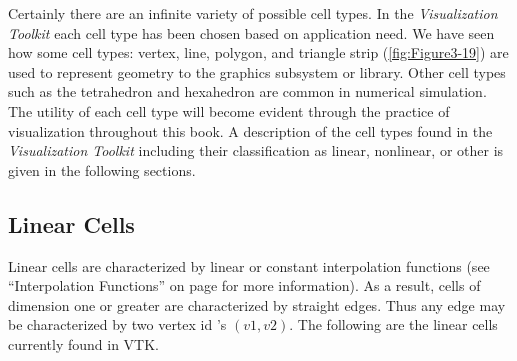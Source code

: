 Certainly there are an infinite variety of possible cell types. In the \emph{Visualization Toolkit} each cell type has been chosen based on application need. We have seen how some cell types: vertex, line, polygon, and triangle strip (\ref{fig:Figure3-19}) are used to represent geometry to the graphics subsystem or library. Other cell types such as the tetrahedron and hexahedron are common in numerical simulation. The utility of each cell type will become evident through the practice of visualization throughout this book. A description of the cell types found in the \emph{Visualization Toolkit} including their classification as linear, nonlinear, or other is given in the following sections.

\subsection{Linear Cells}

Linear cells are characterized by linear or constant interpolation functions (see ``Interpolation Functions'' on page \pageref{sec:interpolation_functions} for more information). As a result, cells of dimension one or greater are characterized by straight edges. Thus any edge may be characterized by two vertex id 's $(v1,v2)$. The following are the linear cells currently found in VTK.

